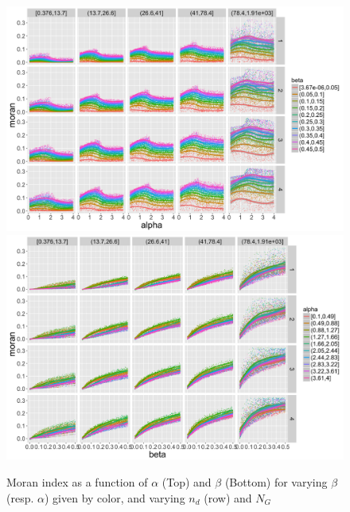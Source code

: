 \begin{figure}
\centering
\includegraphics[width=\textwidth]{figuresraw/moran_alpha}
\includegraphics[width=\textwidth]{figuresraw/moran_beta}
\caption{Moran index as a function of $\alpha$ (Top) and $\beta$ (Bottom) for varying $\beta$ (resp. $\alpha$) given by color, and varying $n_d$ (row) and $N_G$}
\label{}
\end{figure}

